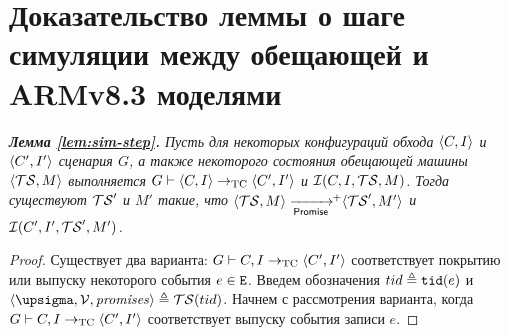 \chapter{Доказательство леммы о шаге симуляции между обещающей и ARMv8.3 моделями}
\label{sec:sim-step-proof}

  \emph{{\bf Лемма \ref{lem:sim-step}.}
  Пусть для некоторых конфигураций обхода ${\langle{C, I}\rangle}$ и ${\langle{C', I'}\rangle}$ сценария $G$,
  а также некоторого состояния обещающей машины ${\langle{\ensuremath{\mathcal{TS}}, M}\rangle}$ выполняется
  $G \vdash {\langle{C, I}\rangle} \rightarrow_{\rm TC} {\langle{C', I'}\rangle}$ и
  $\mathcal{I}(C, I, \mathcal{TS}, M)$.
  Тогда существуют $\mathcal{TS}'$ и $M'$ такие, что $\tup{\TSf, M} \stepp\!\!^{+} \tup{\TSf', M'}$ и
  $\mathcal{I}(C', I', \mathcal{TS}', M')$.}
\begin{proof}%
  Существует два варианта: $G \vdash C, I \rightarrow_{\rm TC} {\langle{C', I'}\rangle}$ соответствует покрытию или
  выпуску некоторого события $e \in {\mathtt{E}}$. Введем обозначения $tid \triangleq {\mathtt{tid}}(e)$ и
  $\tup{\pstate, \View, \PromSet} \defeq \TSf(tid)$.
  Начнем с рассмотрения варианта, когда $G \vdash C, I \rightarrow_{\rm TC} {\langle{C', I'}\rangle}$ соответствует
  выпуску события записи $e$.


\end{proof}
